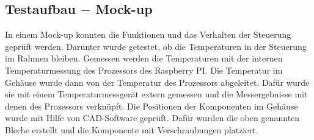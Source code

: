 \subsection{Testaufbau $-$ Mock-up}
In einem Mock-up konnten die Funktionen und das Verhalten der Steuerung geprüft werden. Darunter wurde getestet, ob die Temperaturen in der Steuerung im Rahmen bleiben. Gemessen werden die Temperaturen mit der internen Temperaturmessung des Prozessors des Raspberry PI. Die Temperatur im Gehäuse wurde dann von der Temperatur des Prozessors abgeleitet. Dafür wurde sie mit einem Temperaturmessgerät extern gemessen und die Messergebnisse mit denen des Prozessors verknüpft.
Die Positionen der Komponenten im Gehäuse wurde mit Hilfe von CAD-Software geprüft. Dafür wurden die oben genannten Bleche erstellt und die Komponente mit Verschraubungen platziert.


%
